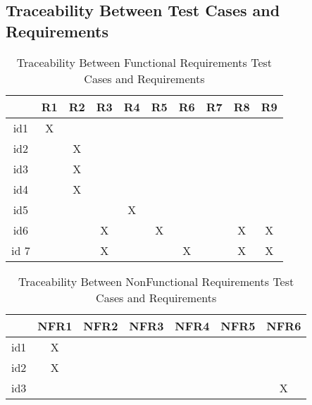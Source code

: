 \documentclass[12pt, titlepage]{article}
\begin{document}
\newpage
\subsection{Traceability Between Test Cases and Requirements}


\begin{table}[h!]
\centering
\begin{tabular}{|c|c|c|c|c|c|c|c|c|c|}
\hline        
	& R1& R2 & R3 &R4 & R5 &R6  &R7 &R8 &R9 \\
\hline
id1        & X &    &     &    &    &    &   &    &    \\ \hline
id2        &    & X &     &    &    &    &   &    &     \\ \hline
id3        &     & X &     &    &    &    &   &    &    \\ \hline
id4        &     & X &     &    &    &    &   &    &      \\ \hline
id5        &    &    &     & X &    &    &   &    &     \\  \hline
id6       &    &    & X &     & X  &    &    & X & X   \\ \hline
id 7      &    &    & X &    &    &  X  &    & X & X \\ \hline


\hline
\end{tabular}
\caption{Traceability Between Functional Requirements Test Cases and
Requirements}
\label{Table:trace}
\end{table}

\begin{table}[h!]
\centering
\begin{tabular}{|c|c|c|c|c|c|c|}
\hline        
	& NFR1& NFR2 & NFR3 &NFR4 & NFR5 &NFR6 \\
\hline
id1        & X &    &     &    &    &     \\ \hline
id2        & X &    &     &    &    &     \\ \hline
id3        &    &    &     &    &    & X  \\ \hline


\hline
\end{tabular}
\caption{Traceability Between NonFunctional Requirements Test Cases and
Requirements}
\label{Table:trace}
\end{table}




\newpage


 
%
\end{document}
